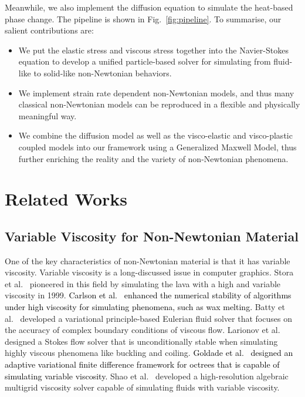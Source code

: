 \documentclass[10pt,journal,compsoc]{IEEEtran}
\newcommand{\revised}[1]{{\textcolor{black}{#1}}}
\begin{document}
Meanwhile, we also implement the diffusion equation to simulate the heat-based phase change. The pipeline is shown in Fig.~\ref{fig:pipeline}. To summarise, our salient contributions are:

\begin{itemize}
	\item We put the elastic stress and viscous stress together into the Navier-Stokes equation to develop a unified particle-based solver for simulating from fluid-like to solid-like non-Newtonian behaviors.
	\item We implement strain rate dependent non-Newtonian models, and thus many classical non-Newtonian models can be reproduced in a flexible and physically meaningful way.
	\item We combine the diffusion model as well as the visco-elastic and visco-plastic coupled models into our framework using a Generalized Maxwell Model, thus further enriching the reality and the variety of non-Newtonian phenomena.
\end{itemize}



\section{Related Works}


\subsection{Variable Viscosity for Non-Newtonian Material}
One of the key characteristics of non-Newtonian material is that it has variable viscosity. Variable viscosity is a long-discussed issue in computer graphics. Stora et al.~\cite{Stora1999} pioneered in this field by simulating the lava with a high and variable viscosity in 1999. \revised{Carlson et al.~\cite{Carlson2002} enhanced the numerical stability of algorithms under high viscosity for simulating phenomena, such as wax melting.} Batty et al.~\cite{Batty2008-accurate-viscous} developed a variational principle-based Eulerian fluid solver that focuses on the accuracy of complex boundary conditions of viscous flow. Larionov et al.~\cite{Larionov2017-variationalStokes} designed a Stokes flow solver that is unconditionally stable when simulating highly viscous phenomena like buckling and coiling. \revised{Goldade et al.~\cite{Goldade2019-Adaptive-Octree-Viscosity} designed an adaptive variational finite difference framework for octrees that is capable of simulating variable viscosity.}  Shao et al.~\cite{Shao-Huang2022-unsmoothed} developed a high-resolution algebraic multigrid viscosity solver capable of simulating fluids with variable viscosity.
\end{document}
